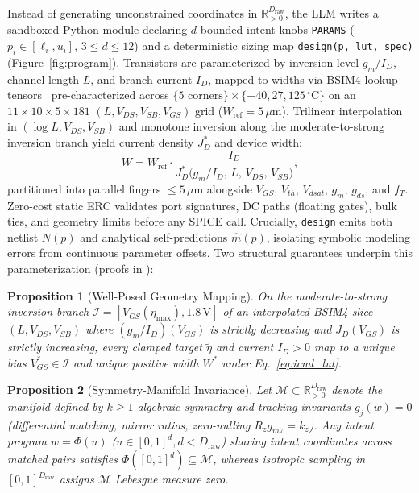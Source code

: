 \documentclass{article}
\theoremstyle{plain}
\newtheorem{proposition}{Proposition}
\begin{document}
Instead of generating unconstrained coordinates in $\mathbb{R}_{>0}^{D_{\text{raw}}}$, the LLM writes a sandboxed Python module declaring $d$ bounded intent knobs \texttt{PARAMS} ($p_i \in [\ell_i, u_i]$, $3 \le d \le 12$) and a deterministic sizing map \texttt{design(p, lut, spec)} (Figure~\ref{fig:program}). Transistors are parameterized by inversion level $g_m/I_D$, channel length $L$, and branch current $I_D$, mapped to widths via BSIM4 lookup tensors~\citep{jespers2017gmid} pre-characterized across $\{5\text{ corners}\}\times\{-40,27,125\,^\circ\mathrm{C}\}$ on an $11\times 10\times 5\times 181$ $(L, V_{DS}, V_{SB}, V_{GS})$ grid ($W_{\text{ref}}=5\,\mu\mathrm{m}$). Trilinear interpolation in $(\log L, V_{DS}, V_{SB})$ and monotone inversion along the moderate-to-strong inversion branch yield current density $J_D^*$ and device width:
\begin{equation}
  W = W_{\text{ref}} \cdot \frac{I_D}{J_D^*\!\big(g_m/I_D,\, L,\, V_{DS},\, V_{SB}\big)},
  \label{eq:icml_lut}
\end{equation}
partitioned into parallel fingers $\le 5\,\mu\mathrm{m}$ alongside $V_{GS}$, $V_{th}$, $V_{dsat}$, $g_m$, $g_{ds}$, and $f_T$. Zero-cost static ERC validates port signatures, DC paths (floating gates), bulk ties, and geometry limits before any SPICE call. Crucially, \texttt{design} emits both netlist $N(p)$ and analytical self-predictions $\hat{m}(p)$, isolating symbolic modeling errors from continuous parameter offsets. Two structural guarantees underpin this parameterization (proofs in ):

\begin{proposition}[Well-Posed Geometry Mapping]
\label{prop:main_lut}
On the moderate-to-strong inversion branch $\mathcal{I} = [V_{GS}(\eta_{\max}), 1.8\,\mathrm{V}]$ of an interpolated BSIM4 slice $(L, V_{DS}, V_{SB})$ where $(g_m/I_D)(V_{GS})$ is strictly decreasing and $J_D(V_{GS})$ is strictly increasing, every clamped target $\tilde{\eta}$ and current $I_D > 0$ map to a unique bias $V_{GS}^* \in \mathcal{I}$ and unique positive width $W^*$ under Eq.~\eqref{eq:icml_lut}.
\end{proposition}

\begin{proposition}[Symmetry-Manifold Invariance]
\label{prop:main_manifold}
Let $\mathcal{M} \subset \mathbb{R}_{>0}^{D_{\text{raw}}}$ denote the manifold defined by $k \ge 1$ algebraic symmetry and tracking invariants $g_j(w)=0$ (differential matching, mirror ratios, zero-nulling $R_z g_{m7} = k_z$). Any intent program $w = \Phi(u)$ ($u \in [0,1]^d, d < D_{\text{raw}}$) sharing intent coordinates across matched pairs satisfies $\Phi([0,1]^d) \subseteq \mathcal{M}$, whereas isotropic sampling in $[0,1]^{D_{\text{raw}}}$ assigns $\mathcal{M}$ Lebesgue measure zero.
\end{proposition}
\end{document}
